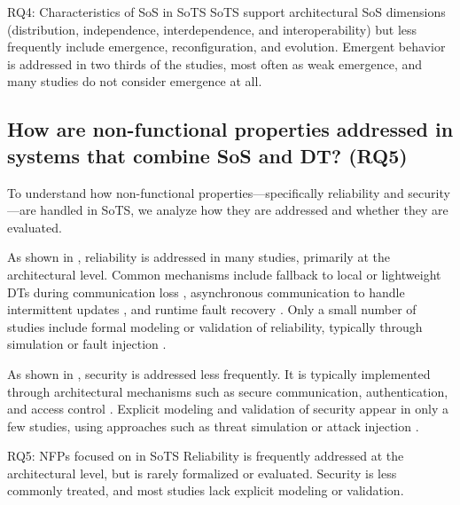 \begin{conclusionframe}{RQ4: Characteristics of SoS in SoTS}
SoTS support architectural SoS dimensions (distribution, independence, interdependence, and interoperability) but less frequently include emergence, reconfiguration, and evolution. Emergent behavior is addressed in two thirds of the studies, most often as weak emergence, and many studies do not consider emergence at all.
\end{conclusionframe}


\subsection{How are non-functional properties addressed in systems that combine SoS and DT? (RQ5)}\label{results-rq5}
To understand how non-functional properties---specifically reliability and security---are handled in SoTS, we analyze how they are addressed and whether they are evaluated.



As shown in , reliability is addressed in many studies, primarily at the architectural level. Common mechanisms include fallback to local or lightweight DTs during communication loss \cite{alam2017c2ps, larsen2024towards}, asynchronous communication to handle intermittent updates \cite{acharya2023twins, liu2020web-based}, and runtime fault recovery \cite{esterle2021digital, villalonga2021decision-making}. Only a small number of studies include formal modeling or validation of reliability, typically through simulation or fault injection \cite{park2020digital, saraeian2022digital}.

As shown in , security is addressed less frequently. It is typically implemented through architectural mechanisms such as secure communication, authentication, and access control \cite{aziz2022empowering, dobie2024network}. Explicit modeling and validation of security appear in only a few studies, using approaches such as threat simulation or attack injection \cite{malayjerdi2022combined, stary2022privacy}.

\begin{conclusionframe}{RQ5: NFPs focused on in SoTS}
Reliability is frequently addressed at the architectural level, but is rarely formalized or evaluated. Security is less commonly treated, and most studies lack explicit modeling or validation.
\end{conclusionframe}


